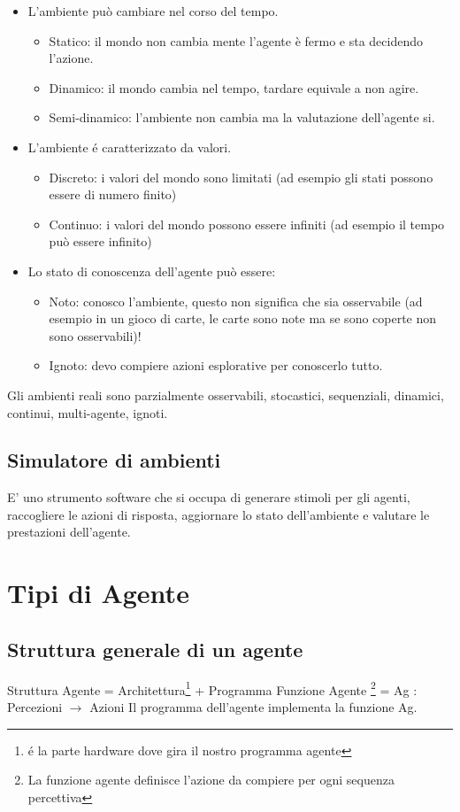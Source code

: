 \documentclass{article}
\begin{document}
\begin{itemize}
    \item L'ambiente può cambiare nel corso del tempo.
        \begin{itemize}
            \item Statico: il mondo non cambia mente l'agente è fermo e sta decidendo l'azione.
            \item Dinamico: il mondo cambia nel tempo, tardare equivale a non agire.
            \item Semi-dinamico: l'ambiente non cambia ma la valutazione dell'agente si.
        \end{itemize}
    \item L'ambiente é caratterizzato da valori.
        \begin{itemize}
            \item Discreto: i valori del mondo sono limitati (ad esempio gli stati possono essere di numero finito)
            \item Continuo: i valori del mondo possono essere infiniti (ad esempio il tempo può essere infinito)
        \end{itemize}
    \item Lo stato di conoscenza dell'agente può essere:
        \begin{itemize}
            \item Noto: conosco l'ambiente, questo non significa che sia osservabile (ad esempio in un gioco di carte, le carte sono note ma se sono coperte non sono osservabili)!
            \item Ignoto: devo compiere azioni esplorative per conoscerlo tutto.
        \end{itemize}
\end{itemize}
Gli ambienti reali sono parzialmente osservabili, stocastici, sequenziali, dinamici, continui, multi-agente, ignoti.

\subsection{Simulatore di ambienti}
E' uno strumento software che si occupa di generare stimoli per gli agenti, raccogliere le azioni di risposta, aggiornare lo stato dell'ambiente e valutare le prestazioni dell'agente.
\clearpage

\section{Tipi di Agente}
\subsection{Struttura generale di un agente}
Struttura Agente = Architettura\footnote{é la parte hardware dove gira il nostro programma agente} + Programma \newline
Funzione Agente \footnote{La funzione agente definisce l'azione da compiere per ogni sequenza percettiva} = Ag : Percezioni $\rightarrow$ Azioni \newline
Il programma dell'agente implementa la funzione Ag.
\end{document}
